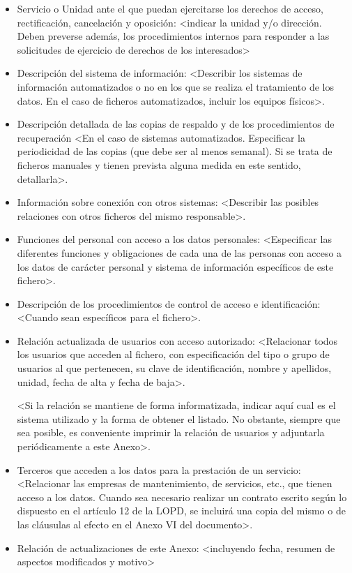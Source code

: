 \documentclass[a4paper,11pt,bibtotoc,noliststotoc]{scrbook}
\begin{document}
\begin{itemize}
\item Servicio o Unidad ante el que puedan ejercitarse los derechos de acceso, rectificación, cancelación y oposición: <indicar la unidad y/o dirección. Deben preverse además, los procedimientos internos para responder a las solicitudes de ejercicio de derechos de los interesados>

\item Descripción del sistema de información: <Describir los sistemas de información automatizados o no en los que se realiza el tratamiento de los datos. En el caso de ficheros automatizados, incluir los equipos físicos>.

\item Descripción detallada de las copias de respaldo y de los procedimientos de recuperación <En el caso de sistemas automatizados. Especificar la periodicidad de las copias (que debe ser al menos semanal). Si se trata de ficheros manuales y tienen prevista alguna medida en este sentido, detallarla>.

\item Información sobre conexión con otros sistemas: <Describir las posibles relaciones con otros ficheros del mismo responsable>.

\item Funciones del personal con acceso a los datos personales: <Especificar las diferentes funciones y obligaciones de cada una de las personas con acceso a los datos de carácter personal y sistema de información específicos de este fichero>.

\item Descripción de los procedimientos de control de acceso e identificación: <Cuando sean específicos para el fichero>.

\item Relación actualizada de usuarios con acceso autorizado: <Relacionar todos los usuarios que acceden al fichero, con especificación del tipo o grupo de usuarios al que pertenecen, su clave de identificación, nombre y apellidos, unidad, fecha de alta y fecha de baja>.

<Si la relación se mantiene de forma informatizada, indicar aquí cual es el sistema utilizado y la forma de obtener el listado. No obstante, siempre que sea posible, es conveniente imprimir la relación de usuarios y adjuntarla periódicamente a este Anexo>.

\item Terceros que acceden a los datos para la prestación de un servicio: <Relacionar las empresas de mantenimiento, de servicios, etc., que tienen acceso a los datos. Cuando sea necesario realizar un contrato escrito según lo dispuesto en el artículo 12 de la LOPD, se incluirá una copia del mismo o de las cláusulas al efecto en el Anexo VI del documento>.

\item Relación de actualizaciones de este Anexo: <incluyendo fecha, resumen de aspectos modificados y motivo>

\end{itemize}
\end{document}
